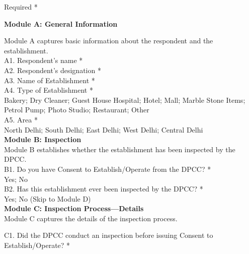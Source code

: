 \documentclass[a4paper, 12pt, twoside]{article}
\begin{document}
		Required *\\
		
                    \begin{mdframed}[backgroundcolor=gray!20]
		\textbf{Module A: General Information}
		
		Module A captures basic information about the respondent and the establishment. \\
		
		A1. Respondent's name * \\
		
		A2. Respondent's designation * \\
		
		A3. Name of Establishment * \\
		
		A4. Type of Establishment * \\
		
		Bakery; Dry Cleaner; Guest House Hospital; Hotel; Mall; Marble Stone Items; Petrol Pump; Photo Studio; Restaurant; Other \\
		
		A5. Area * \\
		
		North Delhi; South Delhi; East Delhi; West Delhi; Central Delhi \\
		
		\textbf{Module B: Inspection} \\						
		
		Module B establishes whether the establishment has been inspected by the DPCC. \\
		
		B1. Do you have Consent to Establish/Operate from the DPCC? * \\
		
		Yes; No \\
		
		B2. Has this establishment ever been inspected by the DPCC? * \\
		
		Yes; No (Skip to Module D) \\	
		
		\textbf{Module C: Inspection Process—Details} \\
		
		Module C captures the details of the inspection process.
		
		C1. Did the DPCC conduct an inspection before issuing Consent to Establish/Operate? * \\
		

\end{mdframed}
\end{document}
